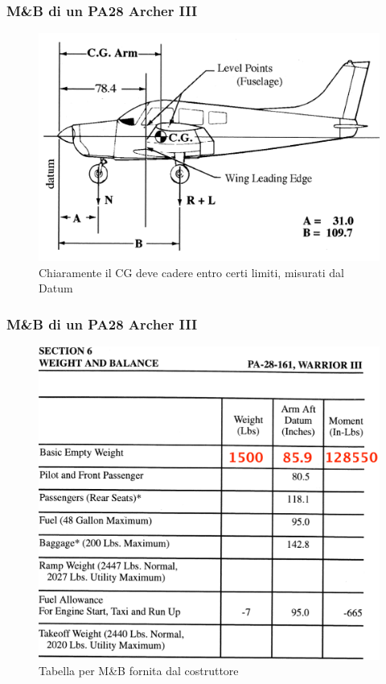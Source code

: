 \documentclass{beamer}
\begin{document}
\begin{frame}
\frametitle{M\&B di un PA28 Archer III}
\begin{figure}
\includegraphics[scale=0.33]{./images/pa28}
\caption{Chiaramente il CG deve cadere entro certi limiti, misurati dal Datum}
\end{figure}
\end{frame}

\begin{frame}
\frametitle{M\&B di un PA28 Archer III}
\begin{figure}
\includegraphics[scale=0.33]{./images/pa28wab}
\caption{Tabella per M\&B fornita dal costruttore}
\end{figure}
\end{frame}
\end{document}
